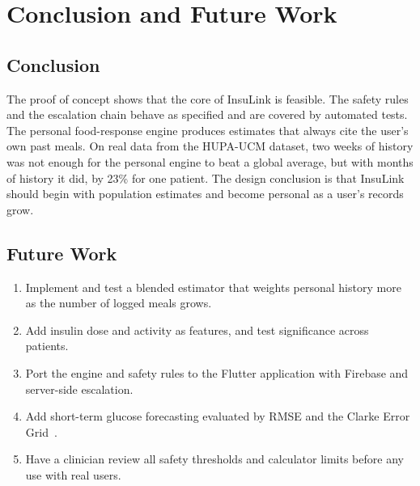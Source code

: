 \chapter{Conclusion and Future Work}

\section{Conclusion}
The proof of concept shows that the core of InsuLink is feasible. The safety rules and the escalation chain behave as specified and are covered by automated tests. The personal food-response engine produces estimates that always cite the user's own past meals. On real data from the HUPA-UCM dataset, two weeks of history was not enough for the personal engine to beat a global average, but with months of history it did, by 23\% for one patient. The design conclusion is that InsuLink should begin with population estimates and become personal as a user's records grow.

\section{Future Work}
\begin{enumerate}
  \item Implement and test a blended estimator that weights personal history more as the number of logged meals grows.
  \item Add insulin dose and activity as features, and test significance across patients.
  \item Port the engine and safety rules to the Flutter application with Firebase and server-side escalation.
  \item Add short-term glucose forecasting evaluated by RMSE and the Clarke Error Grid~\cite{clarke1987}.
  \item Have a clinician review all safety thresholds and calculator limits before any use with real users.
\end{enumerate}
